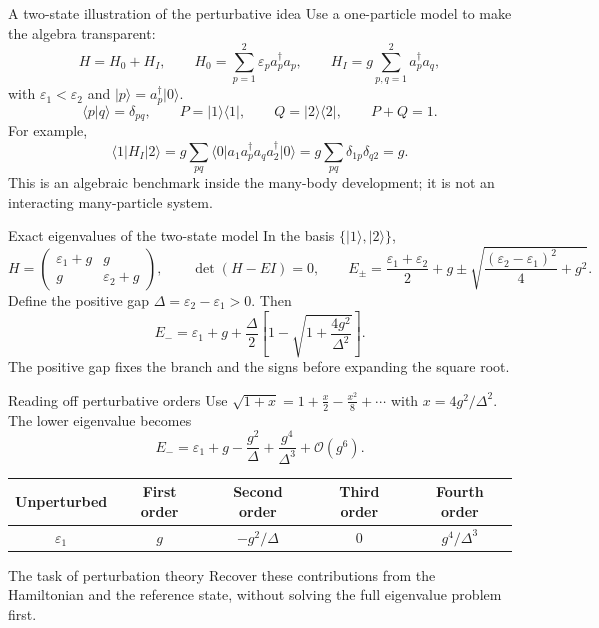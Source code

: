 \documentclass[aspectratio=169,10pt]{beamer}
\newcommand{\ket}[1]{\vert #1\rangle}
\newcommand{\bra}[1]{\langle #1\vert}
\newcommand{\braket}[2]{\langle #1\vert #2\rangle}
\newcommand{\mel}[3]{\langle #1\lvert #2\rvert #3\rangle}
\newcommand{\cre}[1]{a_{#1}^{\dagger}}
\newcommand{\ann}[1]{a_{#1}}
\newcommand{\ord}[1]{\mathcal O(#1)}
\begin{document}
\begin{frame}{A two-state illustration of the perturbative idea}
Use a one-particle model to make the algebra transparent:
\[
H=H_0+H_I,\qquad
H_0=\sum_{p=1}^{2}\varepsilon_p\cre{p}\ann{p},\qquad
H_I=g\sum_{p,q=1}^{2}\cre{p}\ann{q},
\]
with \(\varepsilon_1<\varepsilon_2\) and \(\ket{p}=\cre{p}\ket{0}\).
\[
\braket{p}{q}=\delta_{pq},\qquad
P=\ket{1}\bra{1},\qquad Q=\ket{2}\bra{2},\qquad P+Q=1.
\]
For example,
\[
\mel{1}{H_I}{2}
=g\sum_{pq}\mel{0}{\ann{1}\cre{p}\ann{q}\cre{2}}{0}
=g\sum_{pq}\delta_{1p}\delta_{q2}=g.
\]
\small This is an algebraic benchmark inside the many-body development; it is not an interacting many-particle system.
\end{frame}

\begin{frame}{Exact eigenvalues of the two-state model}
In the basis \(\{\ket{1},\ket{2}\}\),
\[
H=\begin{pmatrix}\varepsilon_1+g&g\\g&\varepsilon_2+g\end{pmatrix},
\qquad \det(H-EI)=0,
\qquad
E_\pm=\frac{\varepsilon_1+\varepsilon_2}{2}+g
\pm\sqrt{\frac{(\varepsilon_2-\varepsilon_1)^2}{4}+g^2}.
\]
Define the positive gap \(\Delta=\varepsilon_2-\varepsilon_1>0\). Then
\[
\boxed{E_-=\varepsilon_1+g+
\frac{\Delta}{2}\left[1-\sqrt{1+\frac{4g^2}{\Delta^2}}\right].}
\]
\small The positive gap fixes the branch and the signs before expanding the square root.
\end{frame}

\begin{frame}{Reading off perturbative orders}
Use
\(\sqrt{1+x}=1+\frac{x}{2}-\frac{x^2}{8}+\cdots\) with \(x=4g^2/\Delta^2\). The lower eigenvalue becomes
\[
\boxed{E_-=\varepsilon_1+g-\frac{g^2}{\Delta}
+\frac{g^4}{\Delta^3}+\ord{g^6}.}
\]
\begin{center}
\begin{tabular}{ccccc}
\toprule
Unperturbed & First order & Second order & Third order & Fourth order\\
\midrule
\(\varepsilon_1\) & \(g\) & \(-g^2/\Delta\) & \(0\) & \(g^4/\Delta^3\)\\
\bottomrule
\end{tabular}
\end{center}
\begin{block}{The task of perturbation theory}
Recover these contributions from the Hamiltonian and the reference state, without solving the full eigenvalue problem first.
\end{block}
\end{frame}
\end{document}
